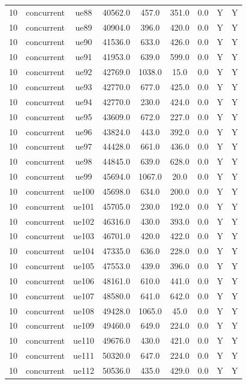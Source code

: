 \begin{table}[ht]
\begin{tabular}{|c|c|c|c|c|c|c|c|c|}
10 & concurrent & ue88 & 40562.0 & 457.0 & 351.0 & 0.0 & Y & Y \\
10 & concurrent & ue89 & 40904.0 & 396.0 & 420.0 & 0.0 & Y & Y \\
10 & concurrent & ue90 & 41536.0 & 633.0 & 426.0 & 0.0 & Y & Y \\
10 & concurrent & ue91 & 41953.0 & 639.0 & 599.0 & 0.0 & Y & Y \\
10 & concurrent & ue92 & 42769.0 & 1038.0 & 15.0 & 0.0 & Y & Y \\
10 & concurrent & ue93 & 42770.0 & 677.0 & 425.0 & 0.0 & Y & Y \\
10 & concurrent & ue94 & 42770.0 & 230.0 & 424.0 & 0.0 & Y & Y \\
10 & concurrent & ue95 & 43609.0 & 672.0 & 227.0 & 0.0 & Y & Y \\
10 & concurrent & ue96 & 43824.0 & 443.0 & 392.0 & 0.0 & Y & Y \\
10 & concurrent & ue97 & 44428.0 & 661.0 & 436.0 & 0.0 & Y & Y \\
10 & concurrent & ue98 & 44845.0 & 639.0 & 628.0 & 0.0 & Y & Y \\
10 & concurrent & ue99 & 45694.0 & 1067.0 & 20.0 & 0.0 & Y & Y \\
10 & concurrent & ue100 & 45698.0 & 634.0 & 200.0 & 0.0 & Y & Y \\
10 & concurrent & ue101 & 45705.0 & 230.0 & 192.0 & 0.0 & Y & Y \\
10 & concurrent & ue102 & 46316.0 & 430.0 & 393.0 & 0.0 & Y & Y \\
10 & concurrent & ue103 & 46701.0 & 420.0 & 422.0 & 0.0 & Y & Y \\
10 & concurrent & ue104 & 47335.0 & 636.0 & 228.0 & 0.0 & Y & Y \\
10 & concurrent & ue105 & 47553.0 & 439.0 & 396.0 & 0.0 & Y & Y \\
10 & concurrent & ue106 & 48161.0 & 610.0 & 441.0 & 0.0 & Y & Y \\
10 & concurrent & ue107 & 48580.0 & 641.0 & 642.0 & 0.0 & Y & Y \\
10 & concurrent & ue108 & 49428.0 & 1065.0 & 45.0 & 0.0 & Y & Y \\
10 & concurrent & ue109 & 49460.0 & 649.0 & 224.0 & 0.0 & Y & Y \\
10 & concurrent & ue110 & 49676.0 & 430.0 & 421.0 & 0.0 & Y & Y \\
10 & concurrent & ue111 & 50320.0 & 647.0 & 224.0 & 0.0 & Y & Y \\
10 & concurrent & ue112 & 50536.0 & 435.0 & 429.0 & 0.0 & Y & Y \\

\end{tabular}
\end{table}
